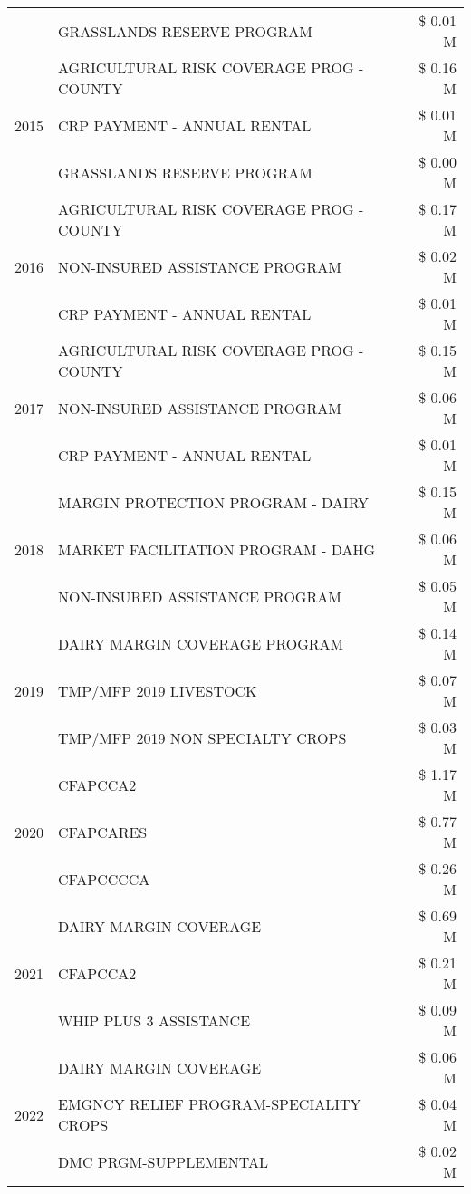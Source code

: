 \begin{tabular}{llr}
 & GRASSLANDS RESERVE PROGRAM & \$ 0.01 M \\
\cline{1-3}
\multirow[t]{3}{*}{2015} & AGRICULTURAL RISK COVERAGE PROG - COUNTY & \$ 0.16 M \\
 & CRP PAYMENT - ANNUAL RENTAL & \$ 0.01 M \\
 & GRASSLANDS RESERVE PROGRAM & \$ 0.00 M \\
\cline{1-3}
\multirow[t]{3}{*}{2016} & AGRICULTURAL RISK COVERAGE PROG - COUNTY & \$ 0.17 M \\
 & NON-INSURED ASSISTANCE PROGRAM & \$ 0.02 M \\
 & CRP PAYMENT - ANNUAL RENTAL & \$ 0.01 M \\
\cline{1-3}
\multirow[t]{3}{*}{2017} & AGRICULTURAL RISK COVERAGE PROG - COUNTY & \$ 0.15 M \\
 & NON-INSURED ASSISTANCE PROGRAM & \$ 0.06 M \\
 & CRP PAYMENT - ANNUAL RENTAL & \$ 0.01 M \\
\cline{1-3}
\multirow[t]{3}{*}{2018} & MARGIN PROTECTION PROGRAM - DAIRY & \$ 0.15 M \\
 & MARKET FACILITATION PROGRAM - DAHG & \$ 0.06 M \\
 & NON-INSURED ASSISTANCE PROGRAM & \$ 0.05 M \\
\cline{1-3}
\multirow[t]{3}{*}{2019} & DAIRY MARGIN COVERAGE PROGRAM & \$ 0.14 M \\
 & TMP/MFP 2019 LIVESTOCK & \$ 0.07 M \\
 & TMP/MFP 2019 NON SPECIALTY CROPS & \$ 0.03 M \\
\cline{1-3}
\multirow[t]{3}{*}{2020} & CFAPCCA2 & \$ 1.17 M \\
 & CFAPCARES & \$ 0.77 M \\
 & CFAPCCCCA & \$ 0.26 M \\
\cline{1-3}
\multirow[t]{3}{*}{2021} & DAIRY MARGIN COVERAGE & \$ 0.69 M \\
 & CFAPCCA2 & \$ 0.21 M \\
 & WHIP PLUS 3 ASSISTANCE & \$ 0.09 M \\
\cline{1-3}
\multirow[t]{3}{*}{2022} & DAIRY MARGIN COVERAGE & \$ 0.06 M \\
 & EMGNCY RELIEF PROGRAM-SPECIALITY CROPS & \$ 0.04 M \\
 & DMC PRGM-SUPPLEMENTAL & \$ 0.02 M \\
\cline{1-3}
\bottomrule
\end{tabular}

